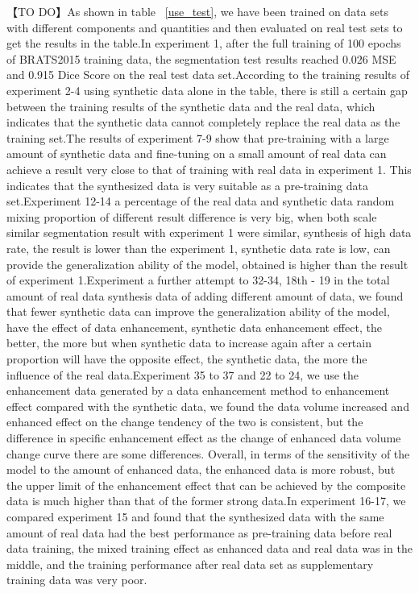\documentclass[letterpaper]{article} %
\begin{document}
【TO DO】As shown in table ~\ref{use_test}, we have been trained on data sets with different components and quantities and then evaluated on real test sets to get the results in the table.In experiment 1, after the full training of 100 epochs of BRATS2015 training data, the segmentation test results reached 0.026 MSE and 0.915 Dice Score on the real test data set.According to the training results of experiment 2-4 using synthetic data alone in the table, there is still a certain gap between the training results of the synthetic data and the real data, which indicates that the synthetic data cannot completely replace the real data as the training set.The results of experiment 7-9 show that pre-training with a large amount of synthetic data and fine-tuning on a small amount of real data can achieve a result very close to that of training with real data in experiment 1. This indicates that the synthesized data is very suitable as a pre-training data set.Experiment 12-14 a percentage of the real data and synthetic data random mixing proportion of different result difference is very big, when both scale similar segmentation result with experiment 1 were similar, synthesis of high data rate, the result is lower than the experiment 1, synthetic data rate is low, can provide the generalization ability of the model, obtained is higher than the result of experiment 1.Experiment a further attempt to 32-34, 18th - 19 in the total amount of real data synthesis data of adding different amount of data, we found that fewer synthetic data can improve the generalization ability of the model, have the effect of data enhancement, synthetic data enhancement effect, the better, the more but when synthetic data to increase again after a certain proportion will have the opposite effect, the synthetic data, the more the influence of the real data.Experiment 35 to 37 and 22 to 24, we use the enhancement data generated by a data enhancement method to enhancement effect compared with the synthetic data, we found the data volume increased and enhanced effect on the change tendency of the two is consistent, but the difference in specific enhancement effect as the change of enhanced data volume change curve there are some differences. Overall, in terms of the sensitivity of the model to the amount of enhanced data, the enhanced data is more robust, but the upper limit of the enhancement effect that can be achieved by the composite data is much higher than that of the former strong data.In experiment 16-17, we compared experiment 15 and found that the synthesized data with the same amount of real data had the best performance as pre-training data before real data training, the mixed training effect as enhanced data and real data was in the middle, and the training performance after real data set as supplementary training data was very poor.
\end{document}
